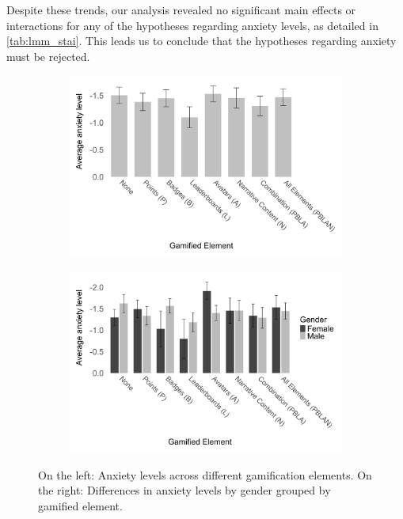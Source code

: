 Despite these trends, our analysis revealed no significant main effects or interactions for any of the hypotheses regarding anxiety levels, as detailed in \autoref{tab:lmm_stai}.
This leads us to conclude that the hypotheses regarding anxiety must be rejected.


\begin{figure}[h]
    \centering
    \begin{subfigure}[b]{0.45\textwidth}
        \includegraphics[width=\textwidth]{img/plots/grey/plot_anxiety.png}
    \end{subfigure}
    \hfill
    \begin{subfigure}[b]{0.45\textwidth}
        \includegraphics[width=\textwidth]{img/plots/grey/plot_anxiety_gender.png}
    \end{subfigure}
    \caption{On the left: Anxiety levels across different gamification elements. On the right: Differences in anxiety levels by gender grouped by gamified element.}
    \label{fig:anxiety_comparison}
\end{figure}

